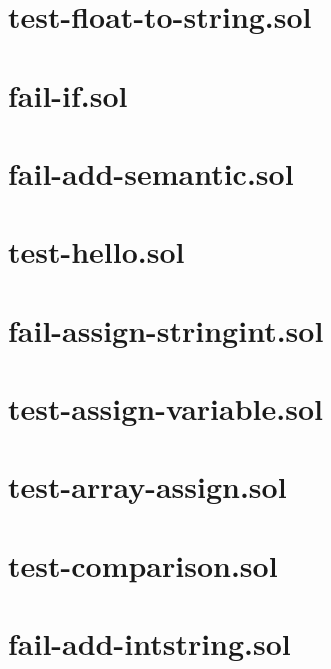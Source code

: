 \section{test-float-to-string.sol}


\section{fail-if.sol}


\section{fail-add-semantic.sol}


\section{test-hello.sol}


\section{fail-assign-stringint.sol}


\section{test-assign-variable.sol}


\section{test-array-assign.sol}


\section{test-comparison.sol}


\section{fail-add-intstring.sol}


